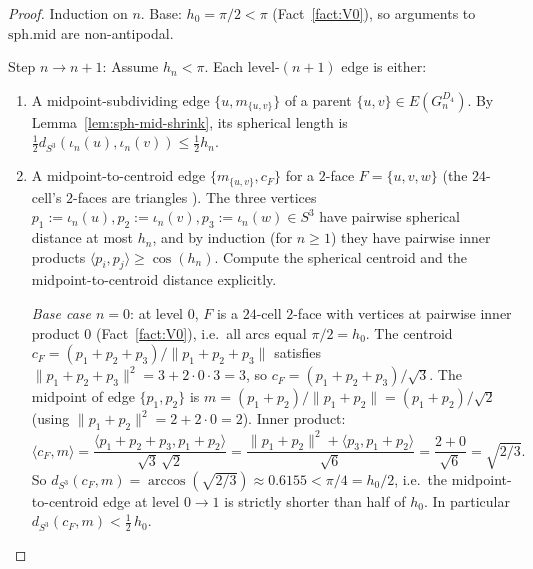 \documentclass[11pt, a4paper]{amsart}
\theoremstyle{definition}
\newcommand{\dsph}{d_{S^3}}
\begin{document}
\begin{proof}
Induction on $n$. Base: $h_0 = \pi/2 < \pi$
(Fact~\ref{fact:V0}), so arguments to $\mathrm{sph.mid}$ are
non-antipodal.

Step $n \to n + 1$: Assume $h_n < \pi$. Each level-$(n+1)$ edge
is either:
\begin{enumerate}
\item A midpoint-subdividing edge $\{u, m_{\{u, v\}}\}$ of a
  parent $\{u, v\} \in E(G_n^{D_4})$. By
  Lemma~\ref{lem:sph-mid-shrink}, its spherical length is
  $\tfrac{1}{2}\dsph(\iota_n(u), \iota_n(v)) \leq \tfrac{1}{2}
  h_n$.
\item A midpoint-to-centroid edge
  $\{m_{\{u, v\}}, c_F\}$ for a $2$-face $F = \{u, v, w\}$ (the
  $24$-cell's $2$-faces are triangles
  \cite[\S 22.2]{CoxeterRegularPolytopes}). The three vertices
  $p_1 := \iota_n(u), p_2 := \iota_n(v), p_3 := \iota_n(w) \in
  S^3$ have pairwise spherical distance at most $h_n$, and by
  induction (for $n \geq 1$) they have pairwise inner products
  $\langle p_i, p_j \rangle \geq \cos(h_n)$. Compute the spherical
  centroid and the midpoint-to-centroid distance explicitly.

  \emph{Base case $n = 0$}: at level $0$, $F$ is a $24$-cell
  $2$-face with vertices at pairwise inner product $0$
  (Fact~\ref{fact:V0}), i.e.\ all arcs equal $\pi/2 = h_0$.
  The centroid $c_F = (p_1 + p_2 + p_3)/\|p_1 + p_2 + p_3\|$
  satisfies $\|p_1 + p_2 + p_3\|^2 = 3 + 2 \cdot 0 \cdot 3 = 3$,
  so $c_F = (p_1 + p_2 + p_3)/\sqrt{3}$. The midpoint of edge
  $\{p_1, p_2\}$ is $m = (p_1 + p_2)/\|p_1 + p_2\| = (p_1 +
  p_2)/\sqrt{2}$ (using $\|p_1 + p_2\|^2 = 2 + 2 \cdot 0 = 2$).
  Inner product:
  \[
    \langle c_F, m \rangle = \frac{\langle p_1 + p_2 + p_3,
      p_1 + p_2\rangle}{\sqrt{3}\,\sqrt{2}}
    = \frac{\|p_1 + p_2\|^2 + \langle p_3, p_1 + p_2\rangle}
      {\sqrt{6}} = \frac{2 + 0}{\sqrt{6}} = \sqrt{2/3}.
  \]
  So $\dsph(c_F, m) = \arccos(\sqrt{2/3}) \approx 0.6155 <
  \pi/4 = h_0/2$, i.e.\ the midpoint-to-centroid edge at level
  $0 \to 1$ is strictly shorter than half of $h_0$. In
  particular $\dsph(c_F, m) < \tfrac{1}{2}\,h_0$.


\end{enumerate}
\end{proof}
\end{document}
